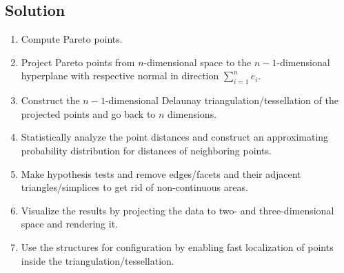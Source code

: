 \documentclass[10pt, twoside]{article}
\begin{document}
    \subsection{Solution} %
    \label{sub:solution}
      \begin{enumerate}
        \item Compute Pareto points.
        \item Project Pareto points from $n$-dimensional space to the $n-1$-dimensional hyperplane with respective normal in direction $\sum_{i=1}^n e_i$.
        \item Construct the $n-1$-dimensional Delaunay triangulation/tessellation of the projected points and go back to $n$ dimensions.
        \item Statistically analyze the point distances and construct an approximating probability distribution for distances of neighboring points.
        \item Make hypothesis tests and remove edges/facets and their adjacent triangles/simplices to get rid of non-continuous areas.
        \item Visualize the results by projecting the data to two- and three-dimensional space and rendering it.
        \item Use the structures for configuration by enabling fast localization of points inside the triangulation/tessellation.
      \end{enumerate}
\end{document}
